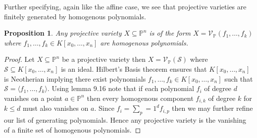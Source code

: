\documentclass[40pt]{article}
\newcommand{\mcal}[1]{\mathcal{#1}}
\newcommand{\Proj}{\mathbb{P}}
\newcommand{\V}{\mathcal{V}}
\newtheorem{proposition}{Proposition}[section]
\theoremstyle{remark}
\begin{document}
Further specifying, again like the affine case, we see that projective varieties are finitely generated by homogenous polynomials. 
\begin{proposition}
	Any projective variety $X \subseteq \Proj^n$ is of the form $X = \V_\Proj(f_1,\dots,f_k)$ where $f_1,\dots,f_k \in K[x_0,\dots,x_n]$ are homogenous polynomials.
\end{proposition}
\begin{proof}
	Let $X \subseteq \Proj^n$ be a projective variety then $X = \V_\Proj(\mcal{S})$ where $\mcal{S} \subseteq K[x_0,\dots,x_n]$ is an ideal. Hilbert's Basis theorem ensures that $K[x_0,\dots,x_n]$ is Neotherian implying there exist polynomials $f_1,\dots,f_k \in K[x_0,\dots,x_n]$ such that $\mcal{S} = \langle f_1,\dots,f_k \rangle$. Using lemma 9.16 note that if each polynomial $f_i$ of degree $d$ vanishes on a point $a \in \Proj^n$ then every homogenous component $f_{i,k}$ of degree $k$ for $k \leq d$ must also vanishes on $a$. Since $f_i = \sum_p=1^d f_{i,p}$ then we may further refine our list of generating polynomials. Hence any projective variety is the vanishing of a finite set of homogenous polynomials. 
\end{proof}
\end{document}
